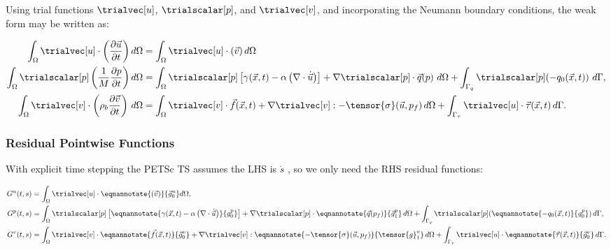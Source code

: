 Using trial functions $\trialvec[u]$, $\trialscalar[p]$, and $\trialvec[v]$, and incorporating the
Neumann boundary conditions, the weak form may be written as:

\begin{align}
    \int_{\Omega} \trialvec[u] \cdot \left( \frac{\partial \vec{u}}{\partial t} \right)d \Omega &= \int_{\Omega} \trialvec[u] \cdot \left( \vec{v} \right) d \Omega \\
    \int_{\Omega} \trialscalar[p] \left( \frac{1}{M}\frac{\partial p}{\partial t} \right) d\Omega &=
    \int_{\Omega} \trialscalar[p] \left[\gamma(\vec{x},t) - \alpha \left(\nabla \cdot \dot{\vec{u}}\right) \right]  + \nabla \trialscalar[p] \cdot \vec{q}(p) \ d\Omega +
    \int_{\Gamma_q} \trialscalar[p] (-q_0(\vec{x},t)) \ d\Gamma, \\
   \int_\Omega \trialvec[v] \cdot \left( \rho_{b} \frac{\partial
   \vec{v}}{\partial t} \right) \,
   d\Omega &= \int_\Omega \trialvec[v] \cdot \vec{f}(\vec{x},t) + \nabla \trialvec[v] :
   -\tensor{\sigma} (\vec{u},p_f) \, d\Omega + \int_{\Gamma_\tau} \trialvec[u]
   \cdot \vec{\tau}(\vec{x},t) \, d\Gamma.
\end{align}



\subsubsection{Residual Pointwise Functions}

With explicit time stepping the PETSc TS assumes the LHS is $\dot{s}$ , so we only need the RHS residual functions:

\begin{align}
  G^u(t,s) &= \int_{\Omega} \trialvec[u] \cdot \eqnannotate{\left( \vec{v} \right)}{\vec{g}_0^u} d \Omega, \\
  G^p(t,s) &= \int_\Omega \trialscalar[p] \left[ \eqnannotate{\gamma(\vec{x},t) - \alpha \left(\nabla \cdot \dot{\vec{u}} \right)}{g^p_0} \right] + \nabla \trialscalar[p] \cdot \eqnannotate{\vec{q}(p_f)}{\vec{g}^p_1} \, d\Omega
 + \int_{\Gamma_q} \trialscalar[p] (\eqnannotate{-q_0(\vec{x},t)}{g^p_0}) \, d\Gamma, \\
 G^v(t,s) &= \int_\Omega \trialvec[v] \cdot \eqnannotate{\vec{f}(\vec{x},t)}{\vec{g}^v_0} + \nabla \trialvec[v] :\eqnannotate{-\tensor{\sigma}(\vec{u},p_f)}{\tensor{g}^v_1} \, d\Omega + \int_{\Gamma_\tau} \trialvec[u] \cdot \eqnannotate{\vec{\tau}(\vec{x},t)}{\vec{g}^v_0} \, d\Gamma.
\end{align}


